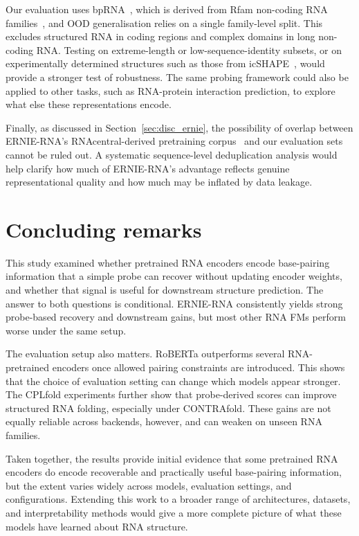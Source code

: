 \documentclass[logo,bsc,singlespacing,parskip]{infthesis}
\begin{document}
Our evaluation uses bpRNA~\citep{danaee2018bprna}, which is derived from Rfam non-coding RNA families~\citep{kalvari2017rfam}, and OOD generalisation relies on a single family-level split. This excludes structured RNA in coding regions and complex domains in long non-coding RNA. Testing on extreme-length or low-sequence-identity subsets, or on experimentally determined structures such as those from icSHAPE~\citep{spitale2015icshape}, would provide a stronger test of robustness. The same probing framework could also be applied to other tasks, such as RNA-protein interaction prediction, to explore what else these representations encode.

Finally, as discussed in Section~\ref{sec:disc_ernie}, the possibility of overlap between ERNIE-RNA's RNAcentral-derived pretraining corpus~\citep{yin2025ernie} and our evaluation sets cannot be ruled out. A systematic sequence-level deduplication analysis would help clarify how much of ERNIE-RNA's advantage reflects genuine representational quality and how much may be inflated by data leakage.

\section{Concluding remarks}
This study examined whether pretrained RNA encoders encode base-pairing information that a simple probe can recover without updating encoder weights, and whether that signal is useful for downstream structure prediction. The answer to both questions is conditional. ERNIE-RNA consistently yields strong probe-based recovery and downstream gains, but most other RNA FMs perform worse under the same setup.

The evaluation setup also matters. RoBERTa outperforms several RNA-pretrained encoders once allowed pairing constraints are introduced. This shows that the choice of evaluation setting can change which models appear stronger. The CPLfold experiments further show that probe-derived scores can improve structured RNA folding, especially under CONTRAfold. These gains are not equally reliable across backends, however, and can weaken on unseen RNA families.

Taken together, the results provide initial evidence that some pretrained RNA encoders do encode recoverable and practically useful base-pairing information, but the extent varies widely across models, evaluation settings, and configurations.  Extending this work to a broader range of architectures, datasets, and interpretability methods would give a more complete picture of what these models have learned about RNA structure. 
\end{document}
